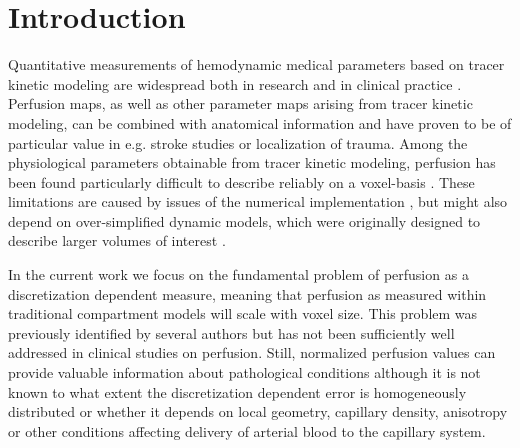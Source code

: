\documentclass[10pt]{article}
\begin{document}
\section{Introduction}
Quantitative measurements of hemodynamic medical parameters based on tracer kinetic modeling are widespread both in research and in clinical practice \cite{sourbron13,Feng2013,Chen2011}. 
	Perfusion maps, as well as other parameter maps arising from tracer kinetic modeling, can be combined with anatomical information and have proven to be of particular value in e.g. stroke studies or localization of trauma.
	Among the physiological parameters obtainable from tracer kinetic modeling, perfusion has been found particularly difficult to describe reliably on a voxel-basis \cite{kudo10}.
	These limitations are caused by issues of the numerical implementation \cite{kudo10}, but might also depend on over-simplified dynamic models, which were originally designed to describe larger volumes of interest \cite{zierler00}.	
	
In the current work we focus on the fundamental problem of perfusion as a discretization dependent measure, meaning that perfusion as measured within traditional compartment models will scale with voxel size. This problem was previously identified by several authors \cite{Henkelman1990,Guibert2013,sourbron14} but has not been sufficiently well addressed in clinical studies on perfusion. Still, normalized perfusion values can provide valuable information about pathological conditions although it is not known to what extent the discretization dependent error is homogeneously distributed or whether it depends on local geometry, capillary density, anisotropy or other conditions affecting delivery of arterial blood to the capillary system. %
\end{document}
